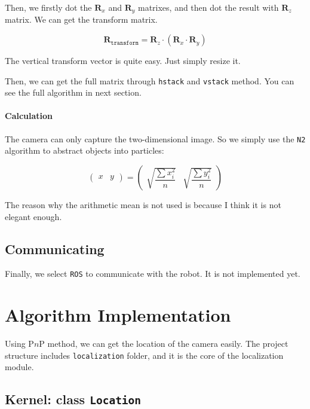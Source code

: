\documentclass{article}
\begin{document}
Then, we firstly dot the $\boldsymbol{R}_x$ and $\boldsymbol{R}_y$ matrixes, and then dot the result with $\boldsymbol{R}_z$ matrix. We can get the transform matrix.

\begin{equation}
  \boldsymbol{R}_{\texttt{transform}}=\boldsymbol{R}_z\cdot\left(\boldsymbol{R}_x\cdot\boldsymbol{R}_y\right)
\end{equation}

The vertical transform vector is quite easy. Just simply resize it.

Then, we can get the full matrix through \texttt{hstack} and \texttt{vstack} method. You can see the full algorithm in next section.

\paragraph{Calculation}

The camera can only capture the two-dimensional image. So we simply use the \texttt{N2} algorithm to abstract objects into particles:

\[
  \left(\begin{matrix}x&y\end{matrix}\right)=\left(\begin{matrix}\sqrt{\dfrac{\sum x_i^2}{n}}&\sqrt{\dfrac{\sum y_i^2}{n}}\end{matrix}\right)
\]

The reason why the arithmetic mean is not used is because I think it is not elegant enough.

\subsection{Communicating}

Finally, we select \texttt{ROS} to communicate with the robot. It is not implemented yet.

\section{Algorithm Implementation}

Using P$n$P method, we can get the location of the camera easily. The project structure includes \texttt{localization} folder, and it is the core of the localization module.

\subsection{Kernel: class \texttt{Location}}
\end{document}
